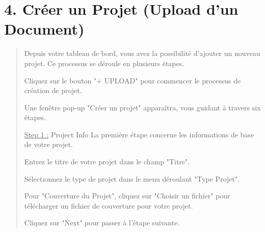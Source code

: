 \documentclass[a4paper,12pt]{article}
\begin{document}
\section*{4. Créer un Projet (Upload d'un Document)}
\begin{quote}
Depuis votre tableau de bord, vous avez la possibilité d’ajouter un nouveau projet. Ce processus se déroule en plusieurs étapes.

Cliquez sur le bouton "+ UPLOAD" pour commencer le processus de création de projet.

Une fenêtre pop-up "Créer un projet" apparaîtra, vous guidant à travers six étapes.

\underline{Step 1 :} Project Info La première étape concerne les informations de base de votre projet.

Entrez le titre de votre projet dans le champ "Titre".

Sélectionnez le type de projet dans le menu déroulant "Type Projet".

Pour "Couverture du Projet", cliquez sur "Choisir un fichier" pour télécharger un fichier de couverture pour votre projet.

Cliquez sur "Next" pour passer à l'étape suivante.



\end{quote}
\end{document}
